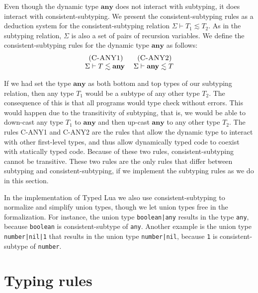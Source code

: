 \documentclass{sigplanconf}
\newcommand{\Any}{\mathbf{any}}
\newcommand{\mylabel}[1]{\; (\textsc{#1})}
\newcommand{\senv}{\Sigma}
\begin{document}
Even though the dynamic type $\Any$ does not interact with subtyping,
it does interact with consistent-subtyping.
We present the consistent-subtyping rules as a deduction system for
the consistent-subtyping relation $\senv \vdash T_{1} \lesssim T_{2}$.
As in the subtyping relation, $\senv$ is also a set of pairs of
recursion variables.
We define the consistent-subtyping rules for the dynamic type $\Any$
as follows:
\[
\begin{array}{c}
\begin{array}{c}
\mylabel{C-ANY1}\\
\senv \vdash T \lesssim \Any
\end{array}
\;
\begin{array}{c}
\mylabel{C-ANY2}\\
\senv \vdash \Any \lesssim T
\end{array}
\end{array}
\]

If we had set the type $\Any$ as both bottom and top types of our
subtyping relation, then any type $T_{1}$ would be a subtype of
any other type $T_{2}$.
The consequence of this is that all programs would type check without errors.
This would happen due to the transitivity of subtyping, that is,
we would be able to down-cast any type $T_{1}$ to $\Any$ and then up-cast
$\Any$ to any other type $T_{2}$.
The rules \textsc{C-ANY1} and \textsc{C-ANY2} are the rules that
allow the dynamic type to interact with other first-level types,
and thus allow dynamically typed code to coexist with statically
typed code.
Because of these two rules, consistent-subtyping cannot be transitive.
These two rules are the only rules that differ between
subtyping and consistent-subtyping, if we implement the subtyping rules
as we do in this section.

In the implementation of Typed Lua we also use consistent-subtyping to
normalize and simplify union types, though we let union types free in
the formalization.
For instance, the union type \texttt{boolean|any} results in the
type \texttt{any}, because \texttt{boolean} is consistent-subtype
of \texttt{any}.
Another example is the union type \texttt{number|nil|1} that
results in the union type \texttt{number|nil}, because
\texttt{1} is consistent-subtype of \texttt{number}.

\section{Typing rules}
\label{sec:rules}
\end{document}
